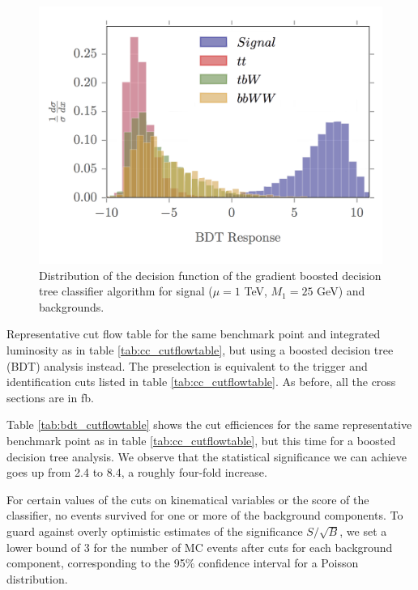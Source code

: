 \documentclass[a4paper,11pt]{article}
\begin{document}
\begin{figure}[h]
\centering
\includegraphics[trim = {0 0.5cm 0 0},clip]{images/bdt_response_png}
\caption{Distribution of the decision function of the gradient boosted decision
tree classifier algorithm for signal ($\mu = 1$ TeV, $M_1 = 25$ GeV) and
backgrounds. }
\label{fig:bdt_response}
\end{figure}

\begin{table}[h]
  \centering
  
  \caption{Representative cut flow table for the same benchmark point and
    integrated luminosity as in table \ref{tab:cc_cutflowtable}, but using a
    boosted decision tree (BDT) analysis instead. The preselection is equivalent
    to the trigger and identification cuts listed in table
    \ref{tab:cc_cutflowtable}. As before, all the cross sections are in
  fb.  }
\label{tab:bdt_cutflowtable}
\end{table}

Table \ref{tab:bdt_cutflowtable} shows the cut efficiences for the same
representative benchmark point as in table \ref{tab:cc_cutflowtable}, but this
time for a boosted decision tree analysis. We observe that the statistical
significance we can achieve goes up from 2.4 to 8.4, a roughly four-fold
increase.  

For certain values of the
cuts on kinematical variables or the score of the classifier, no events survived
for one or more of the background components. To guard against overly optimistic
estimates of the significance $S/\sqrt{B}$, we set a lower bound of 3 for the
number of MC events after cuts for each background component, corresponding to
the 95\% confidence interval for a Poisson distribution. 
\end{document}

